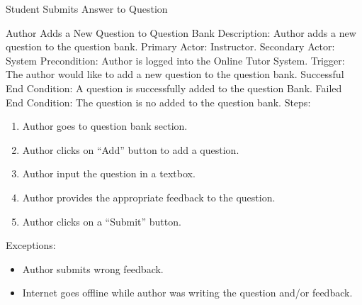 \begin{section}{Student Submits Answer to Question}
    \begin{section}{Author Adds a New Question to Question Bank}
      Description: Author adds a new question to the question bank. \newline
        Primary Actor: Instructor.  \newline
        Secondary Actor: System  \newline
        Precondition: Author is logged into the Online Tutor System. \newline
        Trigger: The author would like to add a new question to the question bank. \newline
        Successful End Condition: A question is successfully added to the question Bank. \newline
        Failed End Condition: The question is no added to the question bank.
   \newline
        \newline
        Steps:
        \begin{enumerate}
            \item{Author goes to question bank section.}
            \item{Author clicks on “Add” button to add a question.}
            \item{Author input the question in a textbox.}
		\item{Author provides the appropriate feedback to the question.}
		\item{Author clicks on a “Submit” button.}
        \end{enumerate}
        Exceptions:
        \begin{itemize}
            \item{Author submits wrong feedback.}
	    \item{Internet goes offline while author was writing the question and/or feedback.}
        \end{itemize}
    \end{section}
    
    
    

\end{section}
